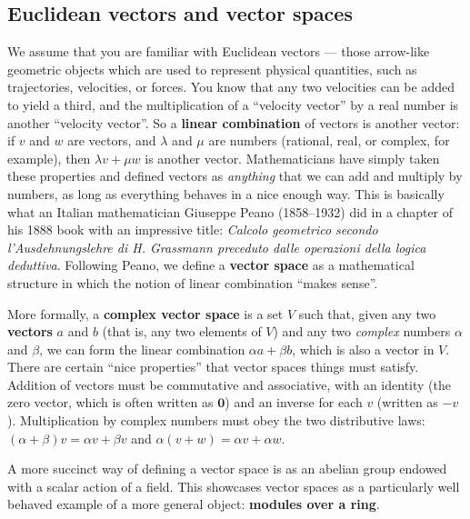 \documentclass[fleqn]{article}
\newenvironment{technical}{\noindent}{\medskip}
\begin{document}
\hypertarget{euclidean-vectors-and-vector-spaces}{%
\subsection{Euclidean vectors and vector spaces}\label{euclidean-vectors-and-vector-spaces}}

We assume that you are familiar with Euclidean vectors --- those arrow-like geometric objects which are used to represent physical quantities, such as trajectories, velocities, or forces.
You know that any two velocities can be added to yield a third, and the multiplication of a ``velocity vector'' by a real number is another ``velocity vector''.
So a \textbf{linear combination} of vectors is another vector: if \(v\) and \(w\) are vectors, and \(\lambda\) and \(\mu\) are numbers (rational, real, or complex, for example), then \(\lambda v+\mu w\) is another vector.
Mathematicians have simply taken these properties and defined vectors as \emph{anything} that we can add and multiply by numbers, as long as everything behaves in a nice enough way.
This is basically what an Italian mathematician Giuseppe Peano (1858--1932) did in a chapter of his 1888 book with an impressive title: \emph{Calcolo geometrico secondo l'Ausdehnungslehre di H. Grassmann preceduto dalle operazioni della logica deduttiva}.
Following Peano, we define a \textbf{vector space} as a mathematical structure in which the notion of linear combination ``makes sense''.

More formally, a \textbf{complex vector space} is a set \(V\) such that, given any two \textbf{vectors} \(a\) and \(b\) (that is, any two elements of \(V\)) and any two \emph{complex} numbers \(\alpha\) and \(\beta\), we can form the linear combination \(\alpha a+\beta b\), which is also a vector in \(V\).
There are certain ``nice properties'' that vector spaces things must satisfy. Addition of vectors must be commutative and associative, with an identity (the zero vector, which is often written as \(\mathbf{0}\)) and an inverse for each \(v\) (written as \(-v\)). Multiplication by complex numbers must obey the two distributive laws: \((\alpha+\beta)v = \alpha v+\beta v\) and \(\alpha (v+w) = \alpha v+\alpha w\).

\begin{technical}
A more succinct way of defining a vector space is as an abelian group endowed with a scalar action of a field.
This showcases vector spaces as a particularly well behaved example of a more general object: \textbf{modules over a ring}.

\end{technical}
\end{document}
